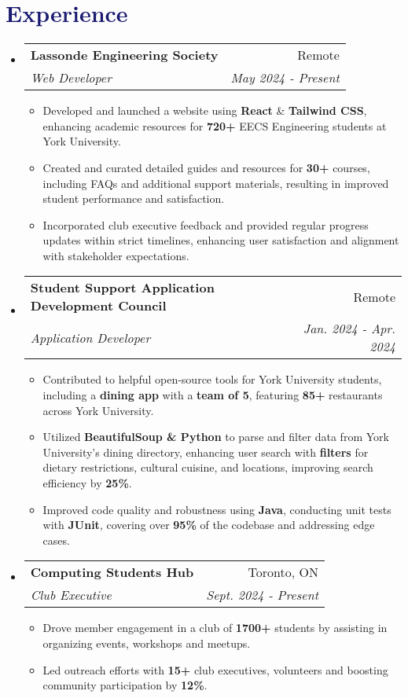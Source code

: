 \documentclass[11pt]{extreport}
\makeatletter
\newcommand{\resumeItem}[1]{
  \item\small{
    {#1 \vspace{-2pt}}
  }
}
\newcommand{\resumeSubheading}[4]{
  \vspace{-2pt}\item
    \begin{tabular*}{0.97\textwidth}[t]{l@{\extracolsep{\fill}}r}
      \textbf{#1} & #2 \\
      \textit{\small#3} & \textit{\small #4} \\  
    \end{tabular*}\vspace{-7pt}
}
\newcommand{\resumeSubHeadingListStart}{\begin{itemize}[leftmargin=0.15in, label={}]}
\newcommand{\resumeSubHeadingListEnd}{\end{itemize}}
\newcommand{\resumeItemListStart}{\begin{itemize}}
\newcommand{\resumeItemListEnd}{\end{itemize}\vspace{-5pt}}
\makeatother
\begin{document}
\section{\textcolor{MidnightBlue}{Experience}}
    \resumeSubHeadingListStart
    \resumeSubheading
        {Lassonde Engineering Society}{Remote}
        {Web Developer}{May 2024 - Present}
        \resumeItemListStart
            \resumeItem{Developed and launched a website using \textbf{React} \& \textbf{Tailwind CSS}, enhancing academic resources for \textbf{720+} EECS Engineering students at York University.}
            \resumeItem{Created and curated detailed guides and resources for \textbf{30+} courses, including FAQs and additional support materials, resulting in improved student performance and satisfaction.}
            \resumeItem{Incorporated club executive feedback and provided regular progress updates within strict timelines, enhancing user satisfaction and alignment with stakeholder expectations.}
        \resumeItemListEnd
    \resumeSubheading
        {Student Support Application Development Council}{Remote}
        {Application Developer}{Jan. 2024 - Apr. 2024}
        \resumeItemListStart
            \resumeItem{Contributed to helpful open-source tools for York University students, including a \textbf{dining app} with a \textbf{team of 5}, featuring \textbf{85+} restaurants across York University.}
            \resumeItem{Utilized \textbf{BeautifulSoup \& Python} to parse and filter data from York University's dining directory, enhancing user search with \textbf{filters} for dietary restrictions, cultural cuisine, and locations, improving search efficiency by \textbf{25\%}.}
            \resumeItem{Improved code quality and robustness using \textbf{Java}, conducting unit tests with \textbf{JUnit}, covering over \textbf{95\%} of the codebase and addressing edge cases.}
        \resumeItemListEnd
    \resumeSubheading
        {Computing Students Hub}{Toronto, ON}
        {Club Executive}{Sept. 2024 - Present}
        \resumeItemListStart
        \resumeItem{Drove member engagement in a club of  \textbf{1700+} students by assisting in organizing events, workshops and meetups.}
        \resumeItem{Led outreach efforts with \textbf{15+} club executives, volunteers and boosting community participation by \textbf{12\%}.}
        \resumeItemListEnd
    \resumeSubHeadingListEnd

\end{document}
